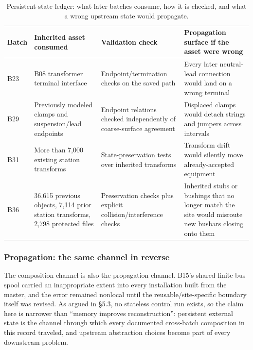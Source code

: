 \documentclass[10pt,a4paper]{article}
\begin{document}
\begin{table}[t]
\centering
\caption{Persistent-state ledger: what later batches consume, how it is checked, and what a wrong upstream state would propagate.}
\label{tab:ledger}
\small
\setlength{\tabcolsep}{5pt}
\renewcommand{\arraystretch}{1.12}
\begin{tabularx}{\textwidth}{@{}p{}p{}XX@{}}
\toprule
\textbf{Batch} & \textbf{Inherited asset consumed} & \textbf{Validation check} & \textbf{Propagation surface if the asset were wrong} \\
\midrule
B23 & B08 transformer terminal interface & Endpoint/termination checks on the saved path & Every later neutral-lead connection would land on a wrong terminal \\
B29 & Previously modeled clamps and suspension/lead endpoints & Endpoint relations checked independently of coarse-surface agreement & Displaced clamps would detach strings and jumpers across intervals \\
B31 & More than 7,000 existing station transforms & State-preservation tests over inherited transforms & Transform drift would silently move already-accepted equipment \\
B36 & 36,615 previous objects, 7,114 prior station transforms, 2,798 protected files & Preservation checks plus explicit collision/interference checks & Inherited stubs or bushings that no longer match the site would misroute new busbars closing onto them \\
\bottomrule
\end{tabularx}
\end{table}

\hypertarget{propagation-the-same-channel-in-reverse}{%
\subsubsection{Propagation: the same channel in
reverse}\label{propagation-the-same-channel-in-reverse}}

The composition channel is also the propagation channel. B15's shared
finite bus spool carried an inappropriate extent into every installation
built from the master, and the error remained nonlocal until the
reusable/site-specific boundary itself was revised. As argued in §5.3,
no stateless control run exists, so the claim here is narrower than
``memory improves reconstruction'': persistent external state is the
channel through which every documented cross-batch composition in this
record traveled, and upstream abstraction choices become part of every
downstream problem.
\end{document}
